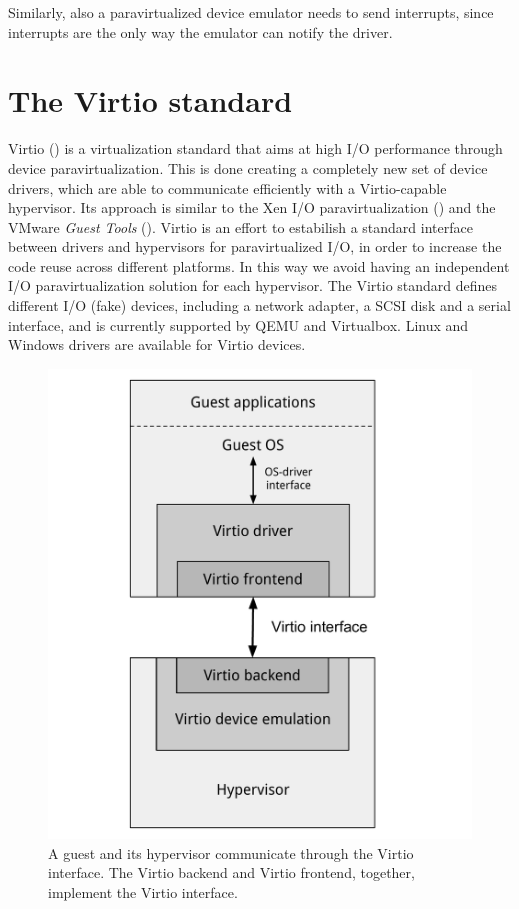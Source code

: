 Similarly, also a paravirtualized device emulator needs to send interrupts, since interrupts are the only way the emulator can notify
the driver.


\section{The Virtio standard}
\label{sec:virtiostd}
Virtio (\cite{ref:virtio}) is a virtualization standard that aims at high I/O performance through device paravirtualization. This is done
creating a completely new set of device drivers, which are able to communicate efficiently with a Virtio-capable hypervisor. Its approach is
similar to the Xen I/O paravirtualization (\cite{ref:xenloop}) and the VMware \emph{Guest Tools} (\cite{ref:vmware2001, ref:vmxnet3}).
Virtio is an effort to estabilish a standard interface between drivers and hypervisors for paravirtualized I/O, in order to increase the 
code reuse across different platforms. In this way we avoid having an independent I/O paravirtualization solution for each hypervisor.
The Virtio standard defines different I/O (fake) devices, including a network adapter, a SCSI disk and a serial interface, and is currently
supported by QEMU and Virtualbox. Linux and Windows drivers are available for Virtio devices.

\begin{figure}[bt]
\centering
\includegraphics[scale = 0.45]{virtio.pdf}
\caption{A guest and its hypervisor communicate through the Virtio interface. The Virtio backend and Virtio frontend, together, implement
	the Virtio interface.}
\label{fig:virtio}
\end{figure}

